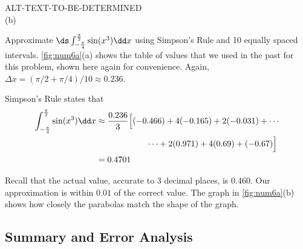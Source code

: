 {{}{ALT-TEXT-TO-BE-DETERMINED}
\\ (b)}%

\begin{example}\label{ex_num6}%
Approximate $\ds\int_{-\frac{\pi}4}^{\frac{\pi}2} \sin (x^3)\dd x$ using Simpson's Rule and 10 equally spaced intervals.
\solution
\autoref{fig:num6a}(a) shows the table of values that we used in the past for this problem, shown here again for convenience. Again, $\Delta x = (\pi/2+\pi/4)/10 \approx 0.236$.

Simpson's Rule states that
{\small\begin{align*}
	\int_{-\frac{\pi}4}^{\frac{\pi}2} \sin (x^3)\dd x
	&\approx \frac{0.236}3\Bigl[(-0.466)+4(-0.165)+2(-0.031) + \dotsb \\
	&\qquad\qquad\qquad \dotsb + 2(0.971) + 4(0.69) + (-0.67)\Bigr]\\
	&= 0.4701
\end{align*}}

Recall that the actual value, accurate to 3 decimal places, is 0.460. Our approximation is within $0.01$ of the correct value. The graph in \autoref{fig:num6a}(b) shows how closely the parabolas match the shape of the graph.
\end{example}

%

\subsection{Summary and Error Analysis}

